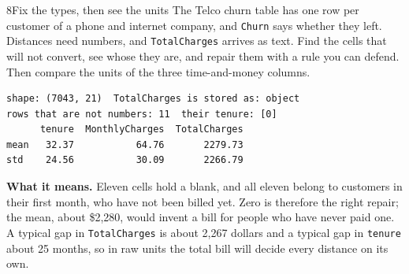 
\begin{labquestion}{8}{Fix the types, then see the units}
The Telco churn table has one row per customer of a phone and internet company, and \texttt{Churn} says whether they left. Distances need numbers, and \texttt{TotalCharges} arrives as text. Find the cells that will not convert, see whose they are, and repair them with a rule you can defend. Then compare the units of the three time-and-money columns.
\end{labquestion}
\begin{labanswer}

\begin{refoutput}
\begin{lstlisting}[style=utpterminal]
shape: (7043, 21)  TotalCharges is stored as: object
rows that are not numbers: 11  their tenure: [0]
      tenure  MonthlyCharges  TotalCharges
mean   32.37           64.76       2279.73
std    24.56           30.09       2266.79
\end{lstlisting}
\end{refoutput}

\textbf{What it means.} Eleven cells hold a blank, and all eleven belong to customers in their first month, who have not been billed yet. Zero is therefore the right repair; the mean, about \$2,280, would invent a bill for people who have never paid one. A typical gap in \texttt{TotalCharges} is about 2,267 dollars and a typical gap in \texttt{tenure} about 25 months, so in raw units the total bill will decide every distance on its own.
\end{labanswer}

